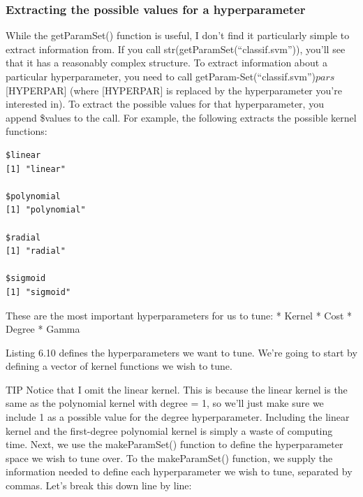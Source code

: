 \documentclass[
]{article}
\newenvironment{Shaded}{\begin{snugshade}}{\end{snugshade}}
\newcommand{\FunctionTok}[1]{\textcolor[rgb]{0.13,0.29,0.53}{\textbf{#1}}}
\newcommand{\NormalTok}[1]{#1}
\newcommand{\SpecialCharTok}[1]{\textcolor[rgb]{0.81,0.36,0.00}{\textbf{#1}}}
\newcommand{\StringTok}[1]{\textcolor[rgb]{0.31,0.60,0.02}{#1}}
\begin{document}
\subsubsection{Extracting the possible values for a
hyperparameter}\label{extracting-the-possible-values-for-a-hyperparameter}

While the getParamSet() function is useful, I don't find it particularly
simple to extract information from. If you call
str(getParamSet(``classif.svm'')), you'll see that it has a reasonably
complex structure. To extract information about a particular
hyperparameter, you need to call
getParam-Set(``classif.svm'')\(pars\){[}HYPERPAR{]} (where
{[}HYPERPAR{]} is replaced by the hyperparameter you're interested in).
To extract the possible values for that hyperparameter, you append
\$values to the call. For example, the following extracts the possible
kernel functions:

\begin{Shaded}
\end{Shaded}

\begin{verbatim}
$linear
[1] "linear"

$polynomial
[1] "polynomial"

$radial
[1] "radial"

$sigmoid
[1] "sigmoid"
\end{verbatim}

These are the most important hyperparameters for us to tune: * Kernel *
Cost * Degree * Gamma

Listing 6.10 defines the hyperparameters we want to tune. We're going to
start by defining a vector of kernel functions we wish to tune.

TIP Notice that I omit the linear kernel. This is because the linear
kernel is the same as the polynomial kernel with degree = 1, so we'll
just make sure we include 1 as a possible value for the degree
hyperparameter. Including the linear kernel and the first-degree
polynomial kernel is simply a waste of computing time. Next, we use the
makeParamSet() function to define the hyperparameter space we wish to
tune over. To the makeParamSet() function, we supply the information
needed to define each hyperparameter we wish to tune, separated by
commas. Let's break this down line by line:
\end{document}
